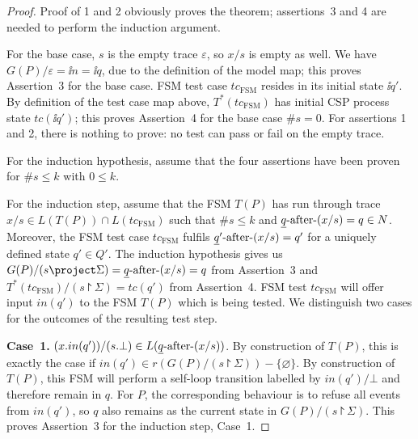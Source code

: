 \begin{proof}
Proof of 1 and 2 obviously proves the theorem; assertions~3 and 4 are 
needed to perform the induction argument.



For the base case, $s$ is the empty trace $\varepsilon$, so $x/s$ is empty as well. We have 
$G(P)/\varepsilon = \ii n = \ii q$, due to the definition of the model map; this proves Assertion~3 for the base case. 
FSM test case $tc_\text{FSM}$ resides in its initial state $\ii q'$. By definition of the test case map above, $T^*(tc_\text{FSM})$ has initial CSP process state $tc(\ii q')$; this proves  Assertion~4 for the base case $\#s = 0$. For assertions 1 and 2, there is nothing to
prove: no test can pass or fail on the empty trace.

For the induction hypothesis, assume that the four assertions have been proven for
$\#s \le k$ with $0\le k$.

For the induction step, assume that the FSM $T(P)$ 
has run through trace $x/s\in L(T(P))\cap L(tc_\text{FSM})$ such that
$\#s \le k$ and $\underline{q}\text{-after-}(x/s) = q\in N$. Moreover, the FSM test case
$tc_\text{FSM}$ fulfils  $\underline{q}'\text{-after-} (x/s) = q'$ for a uniquely defined state 
$q'\in Q'$. The induction hypothesis gives us
$G(P)/(s\project\Sigma) = \ii q\after (x/s) = q$
from Assertion~3 and
$T^*(tc_\text{FSM})/(s\project \Sigma) = tc(q')$ from Assertion~4.
FSM test $tc_\text{FSM}$ will offer input $in(q')$ to the FSM $T(P)$ which is being tested. We distinguish two cases  for the outcomes of the resulting test step.

 
\medskip
\noindent
{\bf Case~1.} $(x.in(q'))/(s.\bot) \in L(\underline{q}\text{-after-} (x/s))$.\newline
By construction of $T(P)$, this is exactly the case if 
$in(q')\in r(G(P)/(s\project \Sigma)) - \{ \varnothing\}$. By construction of $T(P)$,
this FSM will perform a self-loop transition labelled by $in(q')/\bot$ and therefore remain in $q$. For $P$, the corresponding behaviour is to refuse all events from 
$in(q')$, so $q$ also remains as the current state in $G(P)/(s\project \Sigma)$. This proves Assertion~3 for the induction step, Case~1.


\end{proof}
